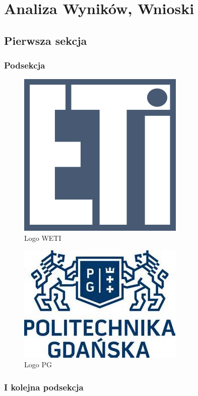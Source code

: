 \section[Analiza Wyników, Wnioski]{Analiza Wyników, Wnioski}

\subsection[Pierwsza sekcja]{Pierwsza sekcja}
\subsubsection{Podsekcja}
\lipsum[6]

\begin{figure}[H]
	\includegraphics[scale=0.8]{imgs/eti.png}
	\caption{Logo WETI}
\end{figure}

\lipsum[3]

\begin{figure}[H]
	\includegraphics[scale=0.8]{imgs/pg.jpg}
	\caption{Logo PG}
\end{figure}

\lipsum[7]

\subsubsection{I kolejna podsekcja}
\lipsum[2]

